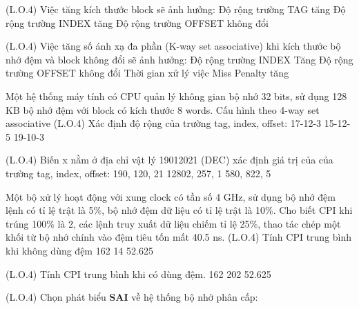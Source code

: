 	\question (L.O.4) Việc tăng kích thước block sẽ ảnh hưởng:
\choice
{Độ rộng trường TAG tăng}
{Độ rộng trường INDEX tăng}
{Độ rộng trường OFFSET không đổi}
{}

\question (L.O.4) Việc tăng số ánh xạ đa phần (K-way set associative) khi kích thước bộ nhớ đệm và block không đổi sẽ ảnh hưởng:
\choice
{}
{Độ rộng trường INDEX Tăng}
{Độ rộng trường OFFSET không đổi}
{Thời gian xử lý việc Miss Penalty tăng}

Một hệ thống máy tính có CPU quản lý không gian bộ nhớ 32 bits, sử dụng 128 KB bộ nhớ đệm với block có kích thước 8 words. Cấu hình theo 4-way set associative 
\question (L.O.4) Xác định độ rộng của trường tag, index, offset:
\onech
{17-12-3}
{}
{15-12-5}
{19-10-3}
\label{2019CS_M-s}

\question (L.O.4) Biến x nằm ở địa chỉ vật lý 19012021 (DEC) xác định giá trị của của trường tag, index, offset:
\onech
{}
{190, 120, 21}
{12802, 257, 1}
{580, 822, 5}
\label{2019CS_M-e}

Một bộ xử lý hoạt động với xung clock có tần số 4 GHz, sử dụng bộ nhớ đệm lệnh có tỉ lệ trật là 5\%, bộ nhớ đệm dữ liệu có tỉ lệ trật là 10\%. Cho biết CPI khi trúng 100\% là 2, các lệnh truy xuất dữ liệu chiếm tỉ lệ 25\%, thao tác chép một khối từ bộ nhớ chính vào đệm tiêu tốn mất 40.5 ns.
\question (L.O.4) Tính CPI trung bình khi không dùng đệm
\onech
{162}
{14}
{}
{52.625}
\label{2019CS_M1-s}


\question (L.O.4) Tính CPI trung bình khi có dùng đệm.
\onech
{162}
{}
{202}
{52.625}

\label{2019CS_M1-e}



\question (L.O.4) Chọn phát biểu \textbf{SAI} về hệ thống bộ nhớ phân cấp:

